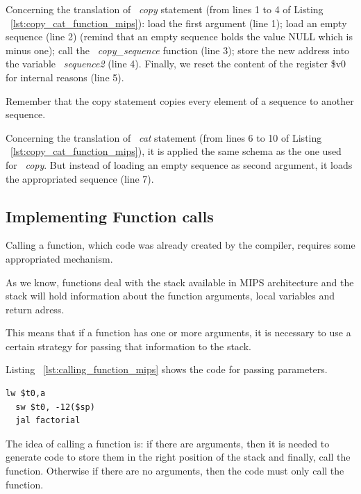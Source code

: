 \documentclass[
  oneside,
  11pt, a4paper,
  footinclude=true,
  headinclude=true,
  cleardoublepage=empty
]{scrbook}
\begin{document}
Concerning the translation of ~\textit{copy} statement (from lines 1 to 4 of Listing ~\ref{lst:copy_cat_function_mips}): load the first argument (line 1); load an empty sequence (line 2) (remind that an empty sequence holds the value NULL which is minus one); call the ~\textit{copy\_sequence} function (line 3); store the new address into the variable ~\textit{sequence2} (line 4). Finally, we reset the content of the register \$v0 for internal reasons (line 5).

Remember that the copy statement copies every element of a sequence to another sequence.

Concerning the translation of ~\textit{cat} statement (from lines 6 to 10 of Listing ~\ref{lst:copy_cat_function_mips}), it is applied the same schema as the one used for ~\textit{copy}. But instead of loading an empty sequence as second argument, it loads the appropriated sequence (line 7).





\subsection{Implementing Function calls}

Calling a function, which  code was already created by the compiler,  requires some appropriated mechanism.

As we know, functions deal with the stack available in MIPS architecture and the stack will hold information about the function arguments, local variables and return adress.

This means that if a function has one or more arguments, it is necessary to use a certain strategy for passing that information to the stack.

Listing ~\ref{lst:calling_function_mips} shows the code for passing parameters.

\begin{lstlisting}[caption={Code generated for calling a function in MIPS},label={lst:calling_function_mips}]
  lw $t0,a		
  sw $t0, -12($sp)
  jal factorial		
\end{lstlisting}

The idea of calling a function is: if there are arguments, then it is needed to generate code to store them in the right position of the stack and finally, call the function. Otherwise if there are no arguments, then the code must only call the function.
\end{document}
